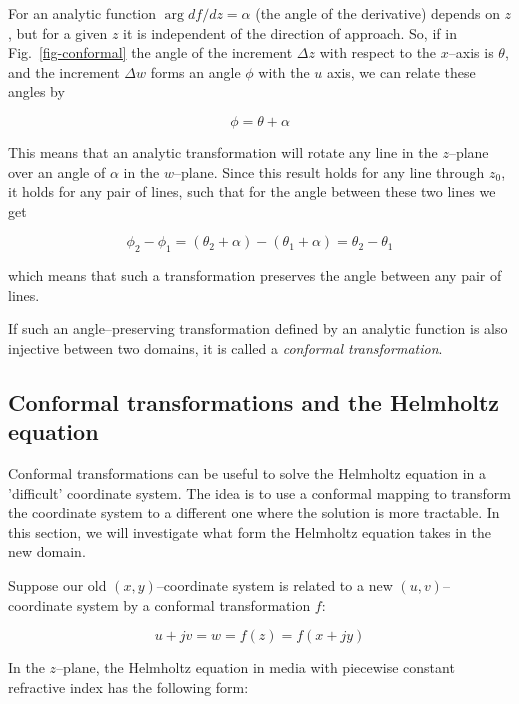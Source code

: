 For an analytic function $\arg df / dz = \alpha$ (the angle of the derivative)
depends on $z$, but for a given $z$ it is independent of the direction of
approach. So, if in Fig.~\ref{fig-conformal} the angle of the increment $\Delta
z$ with respect to the $x$--axis is $\theta$, and the increment $\Delta w$ forms
an angle $\phi$ with the $u$ axis, we can relate these angles by

\begin{equation}
\phi = \theta + \alpha
\end{equation}

This means that an analytic transformation will rotate any line in the
$z$--plane over an angle of $\alpha$ in the $w$--plane.
Since this result holds for any line through $z_0$, it holds for any pair of
lines, such that for the angle between these two lines we get

\begin{equation}
\phi_2 - \phi_1 = (\theta_2 + \alpha) - (\theta_1 + \alpha) = \theta_2 -
\theta_1
\end{equation} 

which means that such a transformation preserves the angle between any pair of
lines.

If such an angle--preserving transformation defined by an analytic function is also injective between two domains, it is
called a \emph{conformal transformation}.

\subsection*{Conformal transformations and the Helmholtz equation}

Conformal transformations can be useful to solve the Helmholtz equation in a
'difficult' coordinate system. The idea is to use a conformal mapping to
transform the coordinate system to a different one where the solution is more
tractable. In this section, we will investigate what form the Helmholtz equation
takes in the new domain.

Suppose our old $(x,y)$--coordinate system is related to a new
$(u,v)$--coordinate system by a conformal transformation $f$:

\begin{equation}
u+jv = w = f(z) = f(x+jy)
\end{equation} 

In the $z$--plane, the Helmholtz equation in media with piecewise constant
refractive index has the following form:

